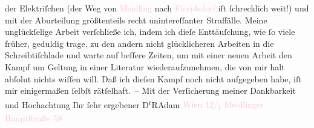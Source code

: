                der Elektriſchen (der Weg von \textcolor{pink}{Meidling}{}\ledrightnote{\textcolor{pink}{XII., Meidling}} nach \textcolor{pink}{Floridsdorf}{}\ledrightnote{\textcolor{pink}{XXI., Floridsdorf}} iſt ſchrecklich weit!) und mit der
               Aburteilung größtenteils recht unintereſſanter Straffälle.\pend
           \pstart
           Meine unglückſelige Arbeit verſchließe ich, indem ich dieſe Enttäuſchung, wie ſo
               viele früher, geduldig trage, zu den andern nicht glücklicheren Arbeiten in die
               Schreibtiſchlade und warte auf beſſere Zeiten, um mit einer neuen Arbeit den Kampf um
               Geltung in einer Literatur wiederaufzunehmen, die von mir halt abſolut nichts wiſſen
               will. Daß ich die{\pb}ſen Kampf noch nicht aufgegeben
               habe, iſt mir einigermaßen ſelbſt rätſelhaft. –\pend
           \pstart
           Mit der Verſicherung meiner Dankbarkeit und Hochachtung Ihr ſehr ergebener\pend
           \pstart \spacefill\mbox{D\textsuperscript{r}RAdam}\pend{}\pstart
           \noindent{}\textcolor{pink}{Wien 12/\textsubscript{1} Meidlinger
                     Hauptſtraße 58}{}\ledrightnote{\textcolor{pink}{Meidlinger Hauptstraße}}\pend
           \endnumbering{}  
      